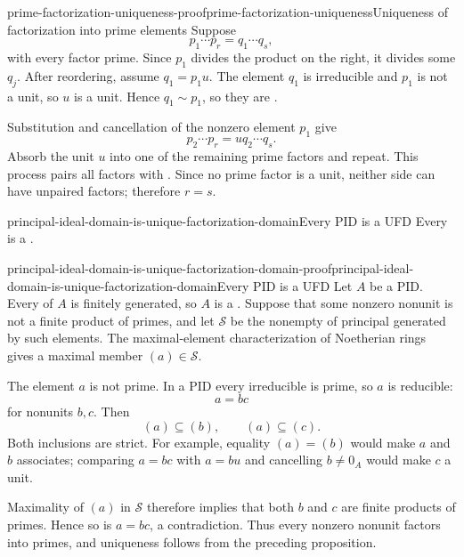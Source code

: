 \documentclass[preview]{standalone}
\begin{document}
\begin{snippetproof}{prime-factorization-uniqueness-proof}{prime-factorization-uniqueness}{Uniqueness of factorization into prime elements}
    Suppose
    \[
        p_1\cdots p_r=q_1\cdots q_s,
    \]
    with every factor prime. Since \(p_1\) divides the product on the
    right, it divides some \(q_j\). After reordering, assume
    \(q_1=p_1u\). The element \(q_1\) is irreducible and \(p_1\) is not a
    unit, so \(u\) is a unit. Hence \(q_1\sim p_1\), so they are
    \associateelements.

    Substitution and cancellation of the nonzero element \(p_1\) give
    \[
        p_2\cdots p_r=uq_2\cdots q_s.
    \]
    Absorb the unit \(u\) into one of the remaining prime factors and
    repeat. This process pairs all factors with \associateelements. Since no prime
    factor is a unit, neither side can have unpaired factors; therefore
    \(r=s\).
\end{snippetproof}

\begin{snippettheorem}{principal-ideal-domain-is-unique-factorization-domain}{Every PID is a UFD}
    Every \principalidealdomain is a \uniquefactorizationdomain.
\end{snippettheorem}

\begin{snippetproof}{principal-ideal-domain-is-unique-factorization-domain-proof}{principal-ideal-domain-is-unique-factorization-domain}{Every PID is a UFD}
    Let \(A\) be a PID. Every \ideal of \(A\) is finitely generated, so
    \(A\) is a \noetherianring. Suppose that some nonzero nonunit is not a
    finite product of primes, and let \(\mathcal{S}\) be the nonempty
    \set of principal \ideal[ideals] generated by such elements. The
    maximal-element characterization of Noetherian rings gives a maximal
    member \((a)\in\mathcal{S}\).

    The element \(a\) is not prime. In a PID every irreducible is prime,
    so \(a\) is reducible:
    \[
        a=bc
    \]
    for nonunits \(b,c\). Then
    \[
        (a)\subseteq(b),
        \qquad
        (a)\subseteq(c).
    \]
    Both inclusions are strict. For example, equality
    \((a)=(b)\) would make \(a\) and \(b\) associates; comparing
    \(a=bc\) with \(a=bu\) and cancelling \(b\neq0_A\) would make \(c\)
    a unit.

    Maximality of \((a)\) in \(\mathcal{S}\) therefore implies that both
    \(b\) and \(c\) are finite products of primes. Hence so is
    \(a=bc\), a contradiction. Thus every nonzero nonunit factors into
    primes, and uniqueness follows from the preceding proposition.
\end{snippetproof}
\end{document}
